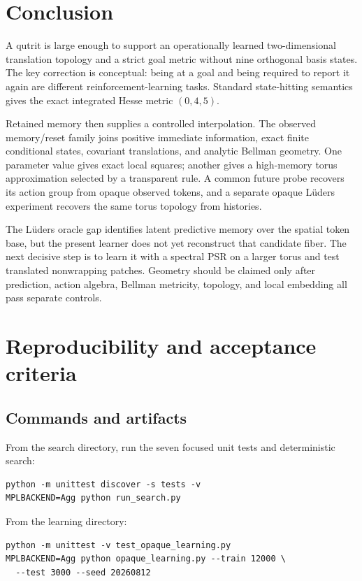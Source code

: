 \documentclass[11pt]{article}
\theoremstyle{definition}
\theoremstyle{remark}
\begin{document}
\section{Conclusion}

A qutrit is large enough to support an operationally learned two-dimensional
translation topology and a strict goal metric without nine orthogonal basis
states. The key correction is conceptual: being at a goal and being required
to report it again are different reinforcement-learning tasks. Standard
state-hitting semantics gives the exact integrated Hesse metric
\((0,4,5)\).

Retained memory then supplies a controlled interpolation. The observed
memory/reset family joins positive immediate information, exact finite
conditional states, covariant translations, and analytic Bellman geometry.
One parameter value gives exact local squares; another gives a high-memory
torus approximation selected by a transparent rule. A common future probe
recovers its action group from opaque observed tokens, and a separate opaque
Lüders experiment recovers the same torus topology from histories.

The Lüders oracle gap identifies latent predictive memory over the spatial
token base, but the present learner does not yet reconstruct that candidate
fiber. The next decisive step is to learn it with a spectral PSR on a larger torus and
test translated nonwrapping patches. Geometry should be claimed only after
prediction, action algebra, Bellman metricity, topology, and local embedding
all pass separate controls.

\appendix
\section{Reproducibility and acceptance criteria}

\subsection{Commands and artifacts}

From the search directory, run the seven focused unit tests and deterministic
search:
\begin{verbatim}
python -m unittest discover -s tests -v
MPLBACKEND=Agg python run_search.py
\end{verbatim}
From the learning directory:
\begin{verbatim}
python -m unittest -v test_opaque_learning.py
MPLBACKEND=Agg python opaque_learning.py --train 12000 \
  --test 3000 --seed 20260812
\end{verbatim}
\end{document}
